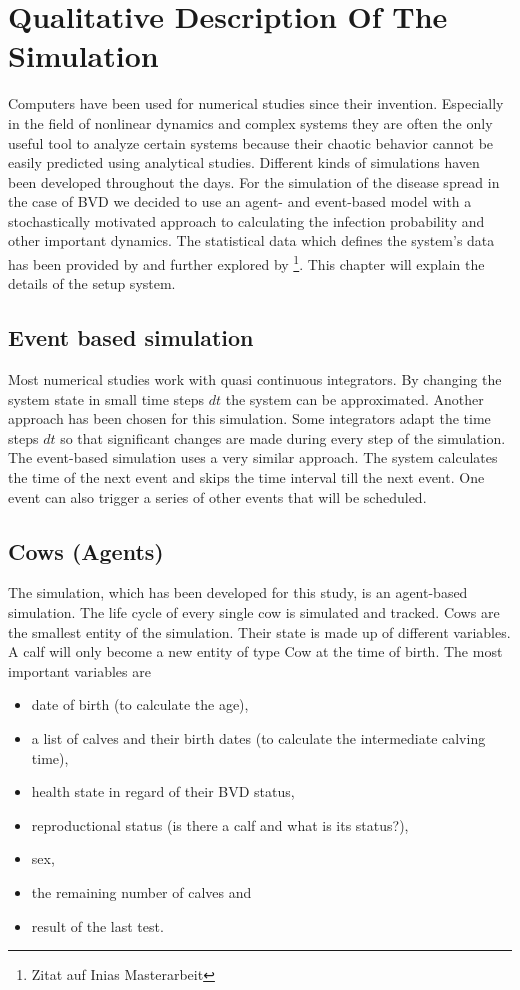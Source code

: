 \chapter{Qualitative Description Of The Simulation}
Computers have been used for numerical studies since their invention. Especially in the field of nonlinear dynamics and complex systems they are often the only useful tool to analyze certain systems because their chaotic behavior cannot be easily predicted using analytical studies. Different kinds of simulations haven been developed throughout the days. For the simulation of the disease spread in the case of BVD we decided to use an agent- and event-based model with a stochastically motivated approach to calculating the infection probability and other important dynamics. The statistical data which defines the system's data has been provided by \citep{personalCom} and further explored by \footnote{Zitat auf Inias Masterarbeit}. This chapter will explain the details of the setup system.
\section{Event based simulation}
Most numerical studies work with quasi continuous integrators. By changing the system state in small time steps $dt$ the system can be approximated. Another approach has been chosen for this simulation. Some integrators adapt the time steps $dt$ so that significant changes are made during every step of the simulation. The event-based simulation uses a very similar approach. The system calculates the time of the next event and skips the time interval till the next event. One event can also trigger a series of other events that will be scheduled. 
\section{Cows (Agents)}
The simulation, which has been developed for this study, is an agent-based simulation. The life cycle of every single cow is simulated and tracked. Cows are the smallest entity of the simulation. Their state is made up of different variables. A calf will only become a new entity of type Cow at the time of birth. The most important variables are 
\begin{itemize}
\item date of birth (to calculate the age),
\item a list of calves and their birth dates (to calculate the intermediate calving time),
\item health state in regard of their BVD status,
\item reproductional status (is there a calf and what is its status?),
\item sex,
\item the remaining number of calves and
\item result of the last test.
\end{itemize}

